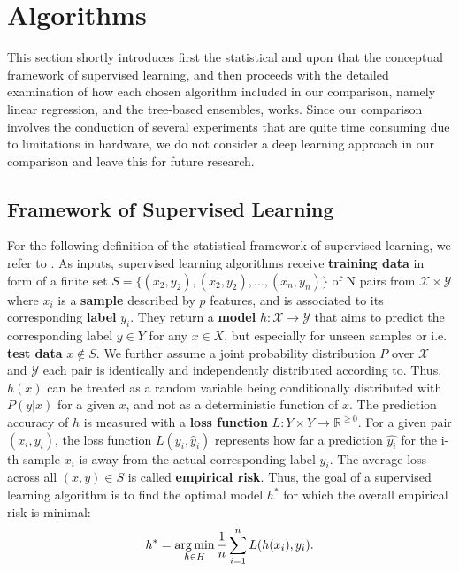 \section{Algorithms}
This section shortly introduces first the statistical  and upon that the conceptual framework of supervised learning, and then proceeds with the detailed examination of how each chosen algorithm included in our comparison, namely linear regression, and the tree-based ensembles, works. Since our comparison involves the conduction of several experiments that are quite time consuming due to limitations in hardware, we do not consider a deep learning approach in our comparison and leave this for future research.

\subsection{Framework of Supervised Learning}

For the following definition of the statistical framework of supervised learning, we refer to \cite{SLFoundations}. As inputs, supervised learning algorithms receive \textbf{training data} in form of a finite set $ S = \{({x}_{2}, y_2), ({x}_{2}, y_2), \dots, ({x}_{n}, y_n)\}$ of N pairs from $ \mathcal{X} \times \mathcal{Y} $ where $ x_i $ is a \textbf{sample} described by $ p $ features, and is associated to its corresponding \textbf{label} $ y_i $.
They return a \textbf{model} $ h: \mathcal{X} \to \mathcal{Y} $ that aims to predict the corresponding label $ y \in Y $ for any $ x \in X $, but especially for unseen samples or i.e. \textbf{test data} $ x \notin S $.
We further assume a joint probability distribution $ P $ over $ \mathcal{X} $ and $ \mathcal{Y} $ each pair is identically and independently distributed according to. 
Thus, $ h(x) $ can be treated as a random variable being conditionally distributed with $ P(y | x) $ for a given $ x $, and not as a deterministic function of $ x $. 
The prediction accuracy of $ h $ is measured with a  \textbf{loss function} $ L : Y \times Y \to \mathbb{R}^{\geq 0}$.
For a given pair $ ({x}_i, y_i) $, the loss function $ L(y_i, \hat{y}_i) $ represents how far a prediction $ \hat{y_i} $ for the i-th sample $ x_i $ is away from the actual corresponding label $ y_i $. 
The average loss across all $ (x,y) \in S $ is called \textbf{empirical risk}.
Thus, the goal of a supervised learning algorithm is to find the optimal model $ h^* $ for which the overall empirical risk is minimal: 
\begin{equation}
	h^* = \operatorname*{arg\,min}_{h \in H} \dfrac{1}{n} \sum_{i=1}^{n} L(h(x_i), y_i).
\end{equation}

